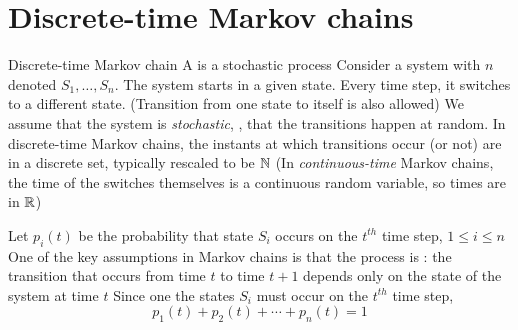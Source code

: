 \documentclass[aspectratio=169]{beamer}
\begin{document}

\section{Discrete-time Markov chains}
\begin{frame}{Discrete-time Markov chain}
A  is a stochastic process
\vfill
Consider a system with $n$  denoted $S_1,\ldots,S_n$. The system starts in a given state. Every time step, it switches to a different state. (Transition from one state to itself is also allowed)
\vfill
We assume that the system is \emph{stochastic}, \ie, that the transitions happen at random. In discrete-time Markov chains, the instants at which transitions occur (or not) are in a discrete set, typically rescaled to be $\mathbb{N}$
\vfill
(In \emph{continuous-time} Markov chains, the time of the switches themselves is a continuous random variable, so times are in $\mathbb{R}$)
\end{frame}

\begin{frame} 
Let $p_i(t)$ be the probability that state $S_i$ occurs on the $t^{th}$ time step, $1\leq i\leq n$
\vfill
One of the key assumptions in Markov chains is that the process is : the transition that occurs from time $t$ to time $t+1$ depends only on the state of the system at time $t$
\vfill
Since one the states $S_i$ must occur on the $t^{th}$ time step,
\[
p_1(t)+p_2(t)+\cdots+p_n(t)=1
\]
\end{frame}
\end{document}
